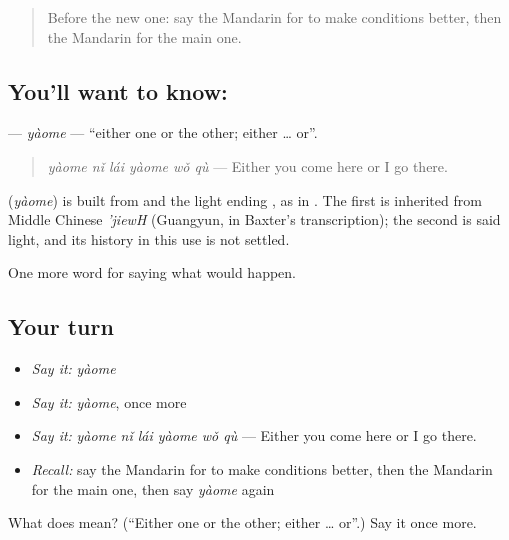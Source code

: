 \label{lesson:ZH-C541-yaome}



\begin{quote}
Before the new one: say the Mandarin for to make conditions better, then the Mandarin for the main one.
\end{quote}

\subsection*{You'll want to know: }
\textbf{} — \emph{yàome} — \textquotedblleft{}either one or the other; either … or\textquotedblright{}.

\begin{quote}
\textbf{} \emph{yàome nǐ lái yàome wǒ qù} — Either you come here or I go there.
\end{quote}

\begin{cousinweb}
\textbf{} (\emph{yàome}) is built from  and the light ending , as in . The first is inherited from Middle Chinese \emph{'jiewH} (Guangyun, in Baxter's transcription); the second is said light, and its history in this use is not settled.
\end{cousinweb}

\begin{grammarlens}[title={What you've built}]
One more word for saying what would happen.
\end{grammarlens}

\subsection*{Your turn}
\begin{itemize}
\raggedright
  \item \emph{Say it:} \emph{yàome}
  \item \emph{Say it:} \emph{yàome}, once more
  \item \emph{Say it:} \emph{yàome nǐ lái yàome wǒ qù} — Either you come here or I go there.
  \item \emph{Recall:} say the Mandarin for to make conditions better, then the Mandarin for the main one, then say \emph{yàome} again
\end{itemize}

\begin{tcolorbox}[breakable,colback=teal!4,colframe=teal!35!black,title={Before you move on}]
What does  mean? (\textquotedblleft{}Either one or the other; either … or\textquotedblright{}.) Say it once more.
\end{tcolorbox}
